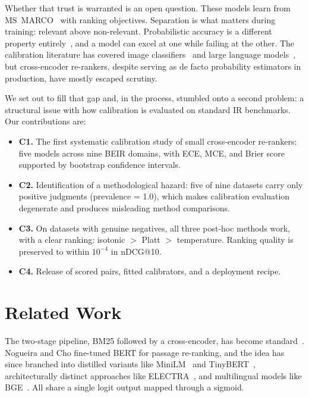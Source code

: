 \documentclass[conference]{IEEEtran}
\begin{document}
Whether that trust is warranted is an open question. These models learn from
MS~MARCO~\cite{nguyen2016msmarco} with ranking objectives. Separation is what
matters during training: relevant above non-relevant. Probabilistic accuracy
is a different property entirely~\cite{degroot1983}, and a model can excel at
one while failing at the other. The calibration literature has covered image
classifiers~\cite{guo2017} and large language models~\cite{kadavath2022}, but
cross-encoder re-rankers, despite serving as de facto probability estimators
in production, have mostly escaped scrutiny.

We set out to fill that gap and, in the process, stumbled onto a second
problem: a structural issue with how calibration is evaluated on standard IR
benchmarks. Our contributions are:

\begin{itemize}[leftmargin=*,itemsep=1pt]
  \item \textbf{C1.} The first systematic calibration study of small
  cross-encoder re-rankers: five models across nine BEIR domains, with ECE,
  MCE, and Brier score supported by bootstrap confidence intervals.

  \item \textbf{C2.} Identification of a methodological hazard: five of nine
  datasets carry only positive judgments (prevalence = 1.0), which makes
  calibration evaluation degenerate and produces misleading method comparisons.

  \item \textbf{C3.} On datasets with genuine negatives, all three post-hoc
  methods work, with a clear ranking: isotonic $>$ Platt $>$ temperature.
  Ranking quality is preserved to within $10^{-4}$ in nDCG@10.

  \item \textbf{C4.} Release of scored pairs, fitted calibrators, and a
  deployment recipe.
\end{itemize}

\section{Related Work}
\label{sec:related}

The two-stage pipeline, BM25 followed by a cross-encoder, has become
standard~\cite{nogueira2019}. Nogueira and Cho fine-tuned BERT for passage
re-ranking, and the idea has since branched into distilled variants like
MiniLM~\cite{wang2020minilm} and TinyBERT~\cite{jiao2020tinybert},
architecturally distinct approaches like ELECTRA~\cite{clark2020electra}, and
multilingual models like BGE~\cite{xiao2023bge}. All share a single logit
output mapped through a sigmoid.
\end{document}
